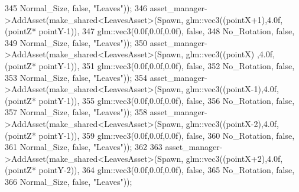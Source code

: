 \begin{DoxyCode}
345                                                              Normal\_Size, \textcolor{keyword}{false}, \textcolor{stringliteral}{"Leaves"}));
346             asset\_manager->AddAsset(make\_shared<LeavesAsset>(Spawn, glm::vec3((pointX+1),4.0f,(pointZ*
      pointY-1)),
347                                                              glm::vec3(0.0f,0.0f,0.0f), \textcolor{keyword}{false},
348                                                              No\_Rotation, \textcolor{keyword}{false},
349                                                              Normal\_Size, \textcolor{keyword}{false}, \textcolor{stringliteral}{"Leaves"}));
350             asset\_manager->AddAsset(make\_shared<LeavesAsset>(Spawn, glm::vec3((pointX)  ,4.0f,(pointZ*
      pointY-1)),
351                                                              glm::vec3(0.0f,0.0f,0.0f), \textcolor{keyword}{false},
352                                                              No\_Rotation, \textcolor{keyword}{false},
353                                                              Normal\_Size, \textcolor{keyword}{false}, \textcolor{stringliteral}{"Leaves"}));
354             asset\_manager->AddAsset(make\_shared<LeavesAsset>(Spawn, glm::vec3((pointX-1),4.0f,(pointZ*
      pointY-1)),
355                                                              glm::vec3(0.0f,0.0f,0.0f), \textcolor{keyword}{false},
356                                                              No\_Rotation, \textcolor{keyword}{false},
357                                                              Normal\_Size, \textcolor{keyword}{false}, \textcolor{stringliteral}{"Leaves"}));
358             asset\_manager->AddAsset(make\_shared<LeavesAsset>(Spawn, glm::vec3((pointX-2),4.0f,(pointZ*
      pointY-1)),
359                                                              glm::vec3(0.0f,0.0f,0.0f), \textcolor{keyword}{false},
360                                                              No\_Rotation, \textcolor{keyword}{false},
361                                                              Normal\_Size, \textcolor{keyword}{false}, \textcolor{stringliteral}{"Leaves"}));
362  
363             asset\_manager->AddAsset(make\_shared<LeavesAsset>(Spawn, glm::vec3((pointX+2),4.0f,(pointZ*
      pointY-2)),
364                                                              glm::vec3(0.0f,0.0f,0.0f), \textcolor{keyword}{false},
365                                                              No\_Rotation, \textcolor{keyword}{false},
366                                                              Normal\_Size, \textcolor{keyword}{false}, \textcolor{stringliteral}{"Leaves"}));

\end{DoxyCode}
